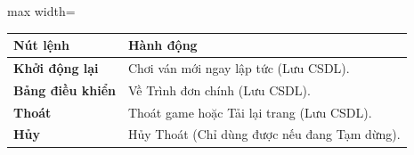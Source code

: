 \documentclass[12pt,a4paper]{article}
\begin{document}
\begin{center}
\begin{adjustbox}{max width=\linewidth}
\begin{tabular}{|l|p{8cm}|}
    \hline
    \textbf{Nút lệnh} & \textbf{Hành động} \\
    \hline
    \textbf{Khởi động lại} & Chơi ván mới ngay lập tức (Lưu CSDL). \\
    \hline
    \textbf{Bảng điều khiển} & Về Trình đơn chính (Lưu CSDL). \\
    \hline
    \textbf{Thoát} & Thoát game hoặc Tải lại trang (Lưu CSDL). \\
    \hline
    \textbf{Hủy} & Hủy Thoát (Chỉ dùng được nếu đang Tạm dừng). \\
    \hline
\end{tabular}
\end{adjustbox}
\end{center}

\label{LastPageUserGuide}
\end{document}
